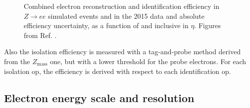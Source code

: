 \begin{figure}[h]
\begin{center}
\end{center}
 \caption{ Combined electron reconstruction and identification efficiency in $Z\rightarrow e e$ simulated events and in the 2015 data and  absolute efficiency uncertainty, as a function of \et and inclusive in $\eta$. Figures from Ref. \cite{ATLAS-CONF-2016-024}. 
 }
  \label{fig:obj:ele_eff}
\end{figure}

Also the isolation efficiency is measured with a tag-and-probe method derived from the $Z_\mathrm{mass}$ one, but with a lower \et threshold for the 
probe electrons. For each isolation \gls{op}, the efficiency is derived with respect to each identification \gls{op}.

\subsection{Electron energy scale and resolution}
\label{sec:obj:ele_energy}

